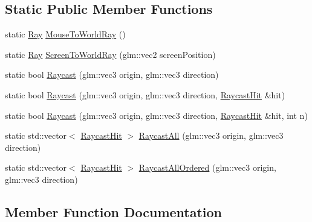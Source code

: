\subsection*{Static Public Member Functions}
\begin{DoxyCompactItemize}
\item 
static \mbox{\hyperlink{struct_beer_engine_1_1_physics_1_1_ray}{Ray}} \mbox{\hyperlink{class_beer_engine_1_1_physics_1_1_physics_af462e9508d245e1477b468f947af9a82}{Mouse\+To\+World\+Ray}} ()
\item 
static \mbox{\hyperlink{struct_beer_engine_1_1_physics_1_1_ray}{Ray}} \mbox{\hyperlink{class_beer_engine_1_1_physics_1_1_physics_ac345bcbfc2b0a5d7dd3b5d7fb6694825}{Screen\+To\+World\+Ray}} (glm\+::vec2 screen\+Position)
\item 
static bool \mbox{\hyperlink{class_beer_engine_1_1_physics_1_1_physics_a75ad2de8af72e4e5309c5c47bdfd6a02}{Raycast}} (glm\+::vec3 origin, glm\+::vec3 direction)
\item 
static bool \mbox{\hyperlink{class_beer_engine_1_1_physics_1_1_physics_a427c654b718bb4948648d55a80934c33}{Raycast}} (glm\+::vec3 origin, glm\+::vec3 direction, \mbox{\hyperlink{struct_beer_engine_1_1_physics_1_1_raycast_hit}{Raycast\+Hit}} \&hit)
\item 
static bool \mbox{\hyperlink{class_beer_engine_1_1_physics_1_1_physics_a2ab720f864bdb8c90ae46626c06cead9}{Raycast}} (glm\+::vec3 origin, glm\+::vec3 direction, \mbox{\hyperlink{struct_beer_engine_1_1_physics_1_1_raycast_hit}{Raycast\+Hit}} \&hit, int n)
\item 
static std\+::vector$<$ \mbox{\hyperlink{struct_beer_engine_1_1_physics_1_1_raycast_hit}{Raycast\+Hit}} $>$ \mbox{\hyperlink{class_beer_engine_1_1_physics_1_1_physics_a8cb427e1ed3ee30ba6abc91b4b303322}{Raycast\+All}} (glm\+::vec3 origin, glm\+::vec3 direction)
\item 
static std\+::vector$<$ \mbox{\hyperlink{struct_beer_engine_1_1_physics_1_1_raycast_hit}{Raycast\+Hit}} $>$ \mbox{\hyperlink{class_beer_engine_1_1_physics_1_1_physics_a8dd767807735fc5cfb4a321e45adaec5}{Raycast\+All\+Ordered}} (glm\+::vec3 origin, glm\+::vec3 direction)
\end{DoxyCompactItemize}


\subsection{Member Function Documentation}
\mbox{\label{class_beer_engine_1_1_physics_1_1_physics_af462e9508d245e1477b468f947af9a82}} 
